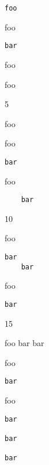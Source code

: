 \begin{verbatim}
foo
\end{verbatim}

foo

\begin{verbatim}
bar
\end{verbatim}

foo

 foo

5

foo

foo

\begin{verbatim}
bar
\end{verbatim}

foo

\begin{verbatim}
	bar
\end{verbatim}

10

foo

\begin{verbatim}
bar
	bar
\end{verbatim}

foo

\begin{verbatim}
bar
\end{verbatim}

15

foo
bar
bar

foo

\begin{verbatim}
bar
\end{verbatim}

foo

\begin{verbatim}
bar

bar

bar
\end{verbatim}
